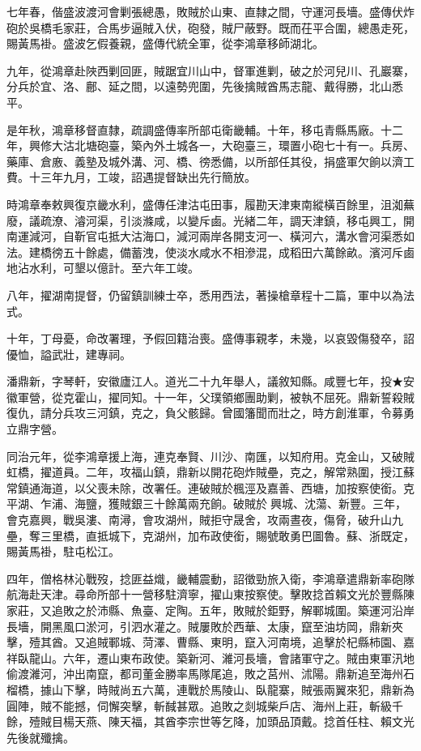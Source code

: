 \begin{pinyinscope}
七年春，偕盛波渡河會剿張總愚，敗賊於山東、直隸之間，守運河長墻。盛傳伏炸砲於吳橋毛家莊，合馬步逼賊入伏，砲發，賊尸蔽野。既而茌平合圍，總愚走死，賜黃馬褂。盛波乞假養親，盛傳代統全軍，從李鴻章移師湖北。

九年，從鴻章赴陜西剿回匪，賊踞宜川山中，督軍進剿，破之於河兒川、孔巖寨，分兵於宜、洛、鄜、延之間，以遠勢兜圍，先後擒賊酋馬志龍、戴得勝，北山悉平。

是年秋，鴻章移督直隸，疏調盛傳率所部屯衛畿輔。十年，移屯青縣馬廠。十二年，興修大沽北塘砲臺，築內外土城各一，大砲臺三，環置小砲七十有一。兵房、藥庫、倉廒、義塾及城外溝、河、橋、徬悉備，以所部任其役，捐盛軍欠餉以濟工費。十三年九月，工竣，詔遇提督缺出先行簡放。

時鴻章奉敕興復京畿水利，盛傳任津沽屯田事，履勘天津東南縱橫百餘里，沮洳蕪廢，議疏潦、濬河渠，引淡滌咸，以變斥鹵。光緒二年，調天津鎮，移屯興工，開南運減河，自靳官屯抵大沽海口，減河兩岸各開支河一、橫河六，溝水會河渠悉如法。建橋徬五十餘處，備蓄洩，使淡水咸水不相滲混，成稻田六萬餘畝。濱河斥鹵地沾水利，可墾以億計。至六年工竣。

八年，擢湖南提督，仍留鎮訓練士卒，悉用西法，著操槍章程十二篇，軍中以為法式。

十年，丁母憂，命改署理，予假回籍治喪。盛傳事親孝，未幾，以哀毀傷發卒，詔優恤，謚武壯，建專祠。

潘鼎新，字琴軒，安徽廬江人。道光二十九年舉人，議敘知縣。咸豐七年，投★安徽軍營，從克霍山，擢同知。十一年，父璞領鄉團助剿，被執不屈死。鼎新誓殺賊復仇，請分兵攻三河鎮，克之，負父骸歸。曾國籓聞而壯之，時方創淮軍，令募勇立鼎字營。

同治元年，從李鴻章援上海，連克奉賢、川沙、南匯，以知府用。克金山，又破賊虹橋，擢道員。二年，攻福山鎮，鼎新以開花砲炸賊壘，克之，解常熟圍，授江蘇常鎮通海道，以父喪未除，改署任。連破賊於楓涇及嘉善、西塘，加按察使銜。克平湖、乍浦、海鹽，獲賊銀三十餘萬兩充餉。破賊於興城、沈蕩、新豐。三年，會克嘉興，戰吳漊、南潯，會攻湖州，賊拒守晟舍，攻兩晝夜，傷脅，破升山九壘，奪三里橋，直抵城下，克湖州，加布政使銜，賜號敢勇巴圖魯。蘇、浙既定，賜黃馬褂，駐屯松江。

四年，僧格林沁戰歿，捻匪益熾，畿輔震動，詔徵勁旅入衛，李鴻章遣鼎新率砲隊航海赴天津。尋命所部十一營移駐濟寧，擢山東按察使。擊敗捻首賴文光於豐縣陳家莊，又追敗之於沛縣、魚臺、定陶。五年，敗賊於鉅野，解鄆城圍。築運河沿岸長墻，開黑風口淤河，引泗水灌之。賊屢敗於西華、太康，竄至油坊岡，鼎新夾擊，殪其酋。又追賊鄆城、菏澤、曹縣、東明，竄入河南境，追擊於杞縣柿園、嘉祥臥龍山。六年，遷山東布政使。築新河、濰河長墻，會諸軍守之。賊由東軍汛地偷渡濰河，沖出南竄，都司董金勝率馬隊尾追，敗之莒州、沭陽。鼎新追至海州石榴橋，據山下擊，時賊尚五六萬，連戰於馬陵山、臥龍寨，賊張兩翼來犯，鼎新為圓陣，賊不能撼，伺懈突擊，斬馘甚眾。追敗之剡城柴戶店、海州上莊，斬級千餘，殪賊目楊天燕、陳天福，其酋李宗世等乞降，加頭品頂戴。捻首任柱、賴文光先後就殲擒。


\end{pinyinscope}
